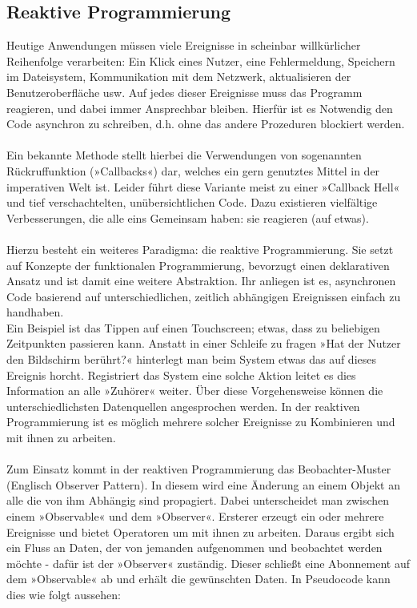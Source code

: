 \subsection{Reaktive Programmierung}
\label{subsec:reaktive-programmierung}
Heutige Anwendungen müssen viele Ereignisse in scheinbar willkürlicher Reihenfolge verarbeiten: Ein Klick eines Nutzer, eine Fehlermeldung, Speichern im Dateisystem, Kommunikation mit dem Netzwerk, aktualisieren der Benutzeroberfläche usw. Auf jedes dieser Ereignisse muss das Programm reagieren, und dabei immer Ansprechbar bleiben. Hierfür ist es Notwendig den Code asynchron zu schreiben, d.h. ohne das andere Prozeduren blockiert werden.
\\\\
Ein bekannte Methode stellt hierbei die Verwendungen von sogenannten Rückruffunktion (»Callbacks«) dar, welches ein gern genutztes Mittel in der imperativen Welt ist. Leider führt diese Variante meist zu einer »Callback Hell« und tief verschachtelten, unübersichtlichen Code. Dazu existieren vielfältige Verbesserungen, die alle eins Gemeinsam haben: sie reagieren (auf etwas).
\\\\
Hierzu besteht ein weiteres Paradigma: die reaktive Programmierung. Sie setzt auf Konzepte der funktionalen Programmierung, bevorzugt einen deklarativen Ansatz und ist damit eine weitere Abstraktion. Ihr anliegen ist es, asynchronen Code basierend auf unterschiedlichen, zeitlich abhängigen Ereignissen einfach zu handhaben.
\\
Ein Beispiel ist das Tippen auf einen Touchscreen; etwas, dass zu beliebigen Zeitpunkten passieren kann. Anstatt in einer Schleife zu fragen »Hat der Nutzer den Bildschirm berührt?« hinterlegt man beim System etwas das auf dieses Ereignis horcht. Registriert das System eine solche Aktion leitet es dies Information an alle »Zuhörer« weiter. Über diese Vorgehensweise können die unterschiedlichsten Datenquellen angesprochen werden. In der reaktiven Programmierung ist es möglich mehrere solcher Ereignisse zu Kombinieren und mit ihnen zu arbeiten.
\\\\
Zum Einsatz kommt in der reaktiven Programmierung das Beobachter-Muster (Englisch Observer Pattern). In diesem wird eine Änderung an einem Objekt an alle die von ihm Abhängig sind propagiert. Dabei unterscheidet man zwischen einem »Observable« und dem »Observer«. Ersterer erzeugt ein oder mehrere Ereignisse und bietet Operatoren um mit ihnen zu arbeiten. Daraus ergibt sich ein Fluss an Daten, der von jemanden aufgenommen und beobachtet werden möchte - dafür ist der »Observer« zuständig. Dieser schließt eine Abonnement auf dem »Observable« ab und erhält die gewünschten Daten. In Pseudocode kann dies wie folgt aussehen:
